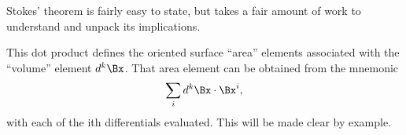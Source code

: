 %
%
Stokes' theorem is fairly easy to state, but takes a fair amount of work to understand and unpack its implications.

This dot product defines the oriented surface ``area'' elements associated with the ``volume'' element \( d^k \Bx \).  That area element can be obtained from the mnemonic
\begin{equation}\label{eqn:stokesTheoremCore:1561}
\sum_i d^k \Bx \cdot \Bx^i,
\end{equation}
with each of the ith differentials evaluated.  This will be made clear by example.
